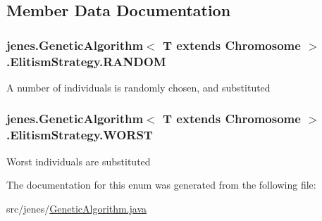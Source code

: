 \subsection{Member Data Documentation}
\hypertarget{enumjenes_1_1_genetic_algorithm_3_01_t_01extends_01_chromosome_01_4_1_1_elitism_strategy_a591ab5eac2a1d3f09f99ab362ee54f65}{
\subsubsection[{R\-A\-N\-D\-O\-M}]{\setlength{\rightskip}{0pt plus 5cm}jenes.\-Genetic\-Algorithm$<$ T extends Chromosome $>$.Elitism\-Strategy.\-R\-A\-N\-D\-O\-M}}\label{enumjenes_1_1_genetic_algorithm_3_01_t_01extends_01_chromosome_01_4_1_1_elitism_strategy_a591ab5eac2a1d3f09f99ab362ee54f65}
A number of individuals is randomly chosen, and substituted \hypertarget{enumjenes_1_1_genetic_algorithm_3_01_t_01extends_01_chromosome_01_4_1_1_elitism_strategy_a60c1acf7a272aca7e29b422a124a2ee2}{
\subsubsection[{W\-O\-R\-S\-T}]{\setlength{\rightskip}{0pt plus 5cm}jenes.\-Genetic\-Algorithm$<$ T extends Chromosome $>$.Elitism\-Strategy.\-W\-O\-R\-S\-T}}\label{enumjenes_1_1_genetic_algorithm_3_01_t_01extends_01_chromosome_01_4_1_1_elitism_strategy_a60c1acf7a272aca7e29b422a124a2ee2}
Worst individuals are substituted 

The documentation for this enum was generated from the following file\-:\begin{DoxyCompactItemize}
\item 
src/jenes/\hyperlink{_genetic_algorithm_8java}{Genetic\-Algorithm.\-java}\end{DoxyCompactItemize}
